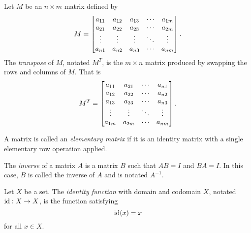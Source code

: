 \begin{SaveDefinition}[
	key=Transpose,
	title={Transpose}]

	Let $M$ be an $n\times m$ matrix defined by
	\[
		M=\begin{bmatrix}
			a_{11}&a_{12}&a_{13}&\cdots & a_{1m}\\
		a_{21}&a_{22}&a_{23}&\cdots&a_{2m}\\
		\vdots &\vdots&\vdots &\ddots&\vdots\\
		a_{n1}&a_{n2}&a_{n3}&\cdots&a_{nm}\end{bmatrix}.
	\]
	The \emph{transpose} of $M$, notated $M^T$, is the $m\times n$ matrix produced by swapping the rows
	and columns of $M$. That is
	\[
		M^T=\begin{bmatrix}
		a_{11}&a_{21}&\cdots&a_{n1}\\
		a_{12}&a_{22}&\cdots&a_{n2}\\
		a_{13}&a_{23}&\cdots&a_{n3}\\
		\vdots&\vdots&\ddots&\vdots\\
		a_{1m}&a_{2m}&\cdots&a_{nm}\end{bmatrix}.
	\]
\end{SaveDefinition}

\begin{SaveDefinition}[
	key=ElementaryMatrix,
	title={Elementary Matrix}]

	A matrix is called an \emph{elementary matrix} if it is an identity matrix with a single elementary row operation applied.
\end{SaveDefinition}

\begin{SaveDefinition}[
	key=MatrixInverse,
	title={Matrix Inverse}]

	The \emph{inverse} of a matrix $A$ is a
		matrix $B$ such that $AB=I$ and $BA=I$.
		In this case, $B$ is called the inverse of $A$ and is notated $A^{-1}$.
\end{SaveDefinition}

\begin{SaveDefinition}[
	key=IdentityFunction,
	title={Identity Function}]

	Let $X$ be a set. The \emph{identity function} with domain and codomain $X$,
	notated $\operatorname{\operatorname{id}}:X\to X$\index[symbols]{$\Ident$}, is the function satisfying
	\[
		\operatorname{\operatorname{id}}(x)=x
	\]
	for all $x\in X$.
\end{SaveDefinition}

